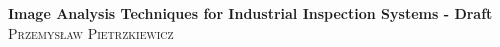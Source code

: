 \newcommand{\coverPage}[2]
{
	\begin{titlingpage}
	\begin{center}







	{ \huge \bfseries #2}\\[0.4cm]

	\textsc{\Large #1}\\[0.5cm]

	\end{center}
	\end{titlingpage}



	\thispagestyle{empty}
	\newpage	

}


\coverPage
{Przemys\l aw Pietrzkiewicz}
{Image Analysis Techniques for Industrial Inspection Systems - Draft}
